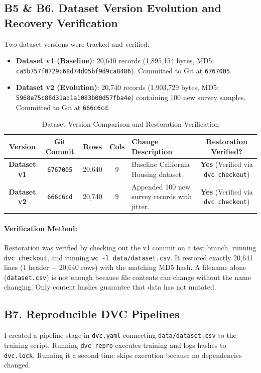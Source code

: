 \documentclass[11pt,a4paper]{article}
\begin{document}
\subsection{B5 \& B6. Dataset Version Evolution and Recovery Verification}
Two dataset versions were tracked and verified:
\begin{itemize}
    \item \textbf{Dataset v1 (Baseline)}: 20,640 records (1,895,154 bytes, MD5: \texttt{ca5b757f0729c68d74d05bf9d9ca8486}). Committed to Git at \texttt{6767005}.
    \item \textbf{Dataset v2 (Evolution)}: 20,740 records (1,903,729 bytes, MD5: \texttt{5968e75c88d31ad1a1083b00d57fba4e}) containing 100 new survey samples. Committed to Git at \texttt{666c6cd}.
\end{itemize}

\begin{table}[htbp]
\centering
\small
\caption{Dataset Version Comparison and Restoration Verification}
\begin{tabularx}{\textwidth}{c c c c X c}
\toprule
\textbf{Version} & \textbf{Git Commit} & \textbf{Rows} & \textbf{Cols} & \textbf{Change Description} & \textbf{Restoration Verified?} \\
\midrule
\textbf{Dataset v1} & \texttt{6767005} & 20,640 & 9 & Baseline California Housing dataset. & \textbf{Yes} (Verified via \texttt{dvc checkout}) \\
\textbf{Dataset v2} & \texttt{666c6cd} & 20,740 & 9 & Appended 100 new survey records with jitter. & \textbf{Yes} (Verified via \texttt{dvc checkout}) \\
\bottomrule
\end{tabularx}
\end{table}

\paragraph{Verification Method:}
Restoration was verified by checking out the v1 commit on a test branch, running \texttt{dvc checkout}, and running \texttt{wc -l data/dataset.csv}. It restored exactly 20,641 lines (1 header + 20,640 rows) with the matching MD5 hash. A filename alone (\texttt{dataset.csv}) is not enough because file contents can change without the name changing. Only content hashes guarantee that data has not mutated.

\subsection{B7. Reproducible DVC Pipelines}
I created a pipeline stage in \texttt{dvc.yaml} connecting \texttt{data/dataset.csv} to the training script. Running \texttt{dvc repro} executes training and logs hashes to \texttt{dvc.lock}. Running it a second time skips execution because no dependencies changed.
\end{document}
